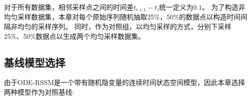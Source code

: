 
对于所有数据集，相邻采样点之间的时间差$t_{i+1}-t_i$统一定义为$0.1$。
为了构造非均匀采样数据集，本章对每个原始序列随机抽取25\%，50\%的数据点以构造时间间隔非均匀的采样序列。
同时，作为对照组，以均匀采样的方式，分别下采样25\%、50\%数据点以生成两个均匀采样数据集。





\subsection{基线模型选择}
由于ODE-RSSM是一个带有随机隐变量的连续时间状态空间模型，因此本章选择两种模型作为对照基线:

